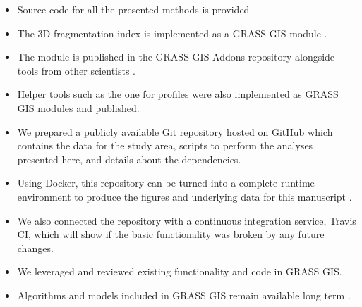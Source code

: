 \documentclass[25pt, margin=0mm, innermargin=15mm, blockverticalspace=15mm, colspace=15mm, subcolspace=8mm]{tikzposter}
\newcommand{\blocktitlewrap}[1]{\textsf{\textbf{\huge#1}}}
\begin{document}
\begin{columns}
{%

\begin{itemize}
 \item Source code for all the presented methods is provided.
 \item The 3D fragmentation index is implemented as a GRASS GIS module \citep{neteler2012grass}.
 \item The module is published in the GRASS GIS Addons repository
       alongside tools from other scientists \citep{chemin2015grass}.
 \item Helper tools such as the one for profiles were also implemented as GRASS GIS modules and published.
 \item We prepared a publicly available Git repository hosted on GitHub
       which contains the data for the study area, scripts to perform the analyses presented here,
       and details about the dependencies.
 \item Using Docker, this repository can be turned into a complete runtime environment
       to produce the figures and underlying data for this manuscript \citep{boettiger2015introduction}.
 \item We also connected the repository with a continuous integration service, Travis CI,
       which will show if the basic functionality was broken by any future changes.
 \item We leveraged and reviewed existing functionality and code in GRASS GIS.
 \item Algorithms and models included in GRASS GIS remain available long term \citep{petras2017innovations}.
\end{itemize}

}

\block{\blocktitlewrap{References}}{

\newcommand{\blocksectiontitle}[1]{\bigskip\textbf{\textcolor{gray}{\textsf{#1}}}}

\newcommand{\listhspace}{\hspace{0.005\linewidth}}
\newcommand{\listlogowidth}{0.10\linewidth}
\newcommand{\listtextwidth}{0.89\linewidth}

\blocksectiontitle{Literature}
\begingroup
\scriptsize
\renewcommand{\section}[2]{}%


\endgroup


}
\end{columns}
\end{document}
